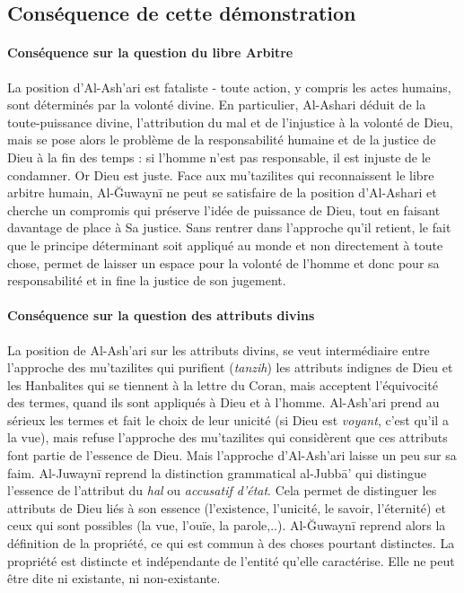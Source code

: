  
\subsection{Conséquence de cette démonstration}

\paragraph{Conséquence sur la question du libre Arbitre}

La position d'Al-Ash'ari est fataliste - toute action, y compris les actes humains, sont déterminés par la volonté divine. En particulier, Al-Ashari déduit de la toute-puissance divine, l'attribution du mal et de l'injustice à la volonté de Dieu, mais se pose alors le problème de la responsabilité humaine et de la justice de Dieu à la fin des temps : si l'homme n'est pas responsable, il est injuste de le condamner. Or Dieu est juste. Face aux mu'tazilites qui reconnaissent le libre arbitre humain, Al-Ğuwaynī ne peut se satisfaire de la position d'Al-Ashari et cherche un compromis qui préserve l'idée de puissance de Dieu, tout en faisant davantage de place à Sa justice. Sans rentrer dans l'approche qu'il retient, le fait que le principe déterminant soit appliqué au monde et non directement à toute chose, permet de laisser un espace pour la volonté de l'homme et donc pour sa responsabilité et in fine la justice de son jugement.

\paragraph{Conséquence sur la question des attributs divins}
La position de Al-Ash'ari sur les attributs divins, se veut intermédiaire entre l'approche des mu'tazilites qui purifient (\emph{tanzih}) les attributs indignes de Dieu et les Hanbalites qui se tiennent à la lettre du Coran, mais acceptent l'équivocité des termes, quand ils sont appliqués à Dieu et à l'homme. Al-Ash'ari prend au sérieux les termes et fait le choix de leur unicité (si Dieu est \textit{voyant}, c'est qu'il a la vue), mais refuse l'approche des mu'tazilites qui considèrent que ces attributs font partie de l'essence de Dieu. Mais l'approche d'Al-Ash'ari laisse un peu sur sa faim.
Al-Juwaynī reprend la distinction grammatical  al-Jubbā' qui distingue l'essence de l'attribut du \textit{hal} ou \textit{accusatif d'état}. Cela  permet de distinguer les attributs de Dieu liés à son essence (l'existence, l'unicité, le savoir, l'éternité) et ceux qui sont possibles (la vue, l'ouïe, la parole,..). Al-Ğuwaynī reprend alors la définition de la propriété, ce qui est commun à des choses pourtant distinctes. La propriété est distincte et indépendante de l'entité qu'elle caractérise. Elle ne peut être dite ni existante, ni non-existante. 

